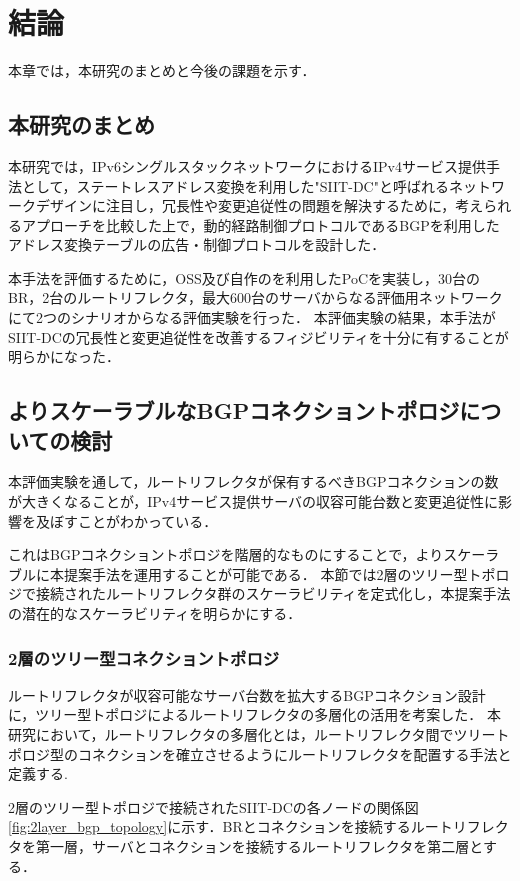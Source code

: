 \chapter{結論}
\label{conclusion}

本章では，本研究のまとめと今後の課題を示す．

\section{本研究のまとめ}
本研究では，IPv6シングルスタックネットワークにおけるIPv4サービス提供手法として，ステートレスアドレス変換を利用した"SIIT-DC"と呼ばれるネットワークデザインに注目し，冗長性や変更追従性の問題を解決するために，考えられるアプローチを比較した上で，動的経路制御プロトコルであるBGPを利用したアドレス変換テーブルの広告・制御プロトコルを設計した．

本手法を評価するために，OSS及び自作のを利用したPoCを実装し，30台のBR，2台のルートリフレクタ，最大600台のサーバからなる評価用ネットワークにて2つのシナリオからなる評価実験を行った．
本評価実験の結果，本手法がSIIT-DCの冗長性と変更追従性を改善するフィジビリティを十分に有することが明らかになった．

\section{よりスケーラブルなBGPコネクショントポロジについての検討}
本評価実験を通して，ルートリフレクタが保有するべきBGPコネクションの数が大きくなることが，IPv4サービス提供サーバの収容可能台数と変更追従性に影響を及ぼすことがわかっている．

これはBGPコネクショントポロジを階層的なものにすることで，よりスケーラブルに本提案手法を運用することが可能である．
本節では2層のツリー型トポロジで接続されたルートリフレクタ群のスケーラビリティを定式化し，本提案手法の潜在的なスケーラビリティを明らかにする．

\subsection{2層のツリー型コネクショントポロジ}
\label{conclusion:tree:2layer}

ルートリフレクタが収容可能なサーバ台数を拡大するBGPコネクション設計に，ツリー型トポロジによるルートリフレクタの多層化の活用を考案した．
本研究において，ルートリフレクタの多層化とは，ルートリフレクタ間でツリートポロジ型のコネクションを確立させるようにルートリフレクタを配置する手法と定義する.

2層のツリー型トポロジで接続されたSIIT-DCの各ノードの関係図\ref{fig:2layer_bgp_topology}に示す．BRとコネクションを接続するルートリフレクタを第一層，サーバとコネクションを接続するルートリフレクタを第二層とする．

